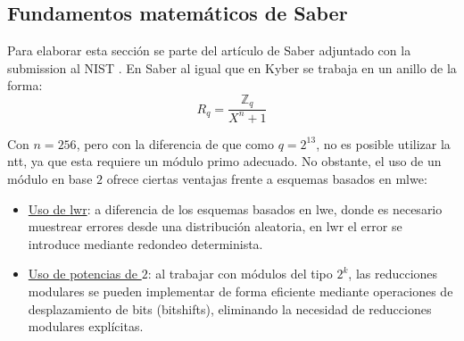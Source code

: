 \subsection{Fundamentos matemáticos de Saber}
Para elaborar esta sección se parte del artículo de Saber adjuntado con la submission al NIST \cite{saber-spec-2020}. En Saber al igual que en Kyber se trabaja en un anillo de la forma:
\begin{equation}
	R_q=\dfrac{\mathbb{Z}_q}{X^n+1}
\end{equation}

Con \(n=256\), pero con la diferencia de que como \(q=2^{13}\), no es posible utilizar la \gls{ntt}, ya que esta requiere un módulo primo adecuado. No obstante, el uso de un módulo en base \(2\) ofrece ciertas ventajas \cite{modlwr} frente a esquemas basados en \gls{mlwe}:
\begin{itemize}
	\item \underline{Uso de \gls{lwr}}: a diferencia de los esquemas basados en \gls{lwe}, donde es necesario muestrear errores desde una distribución aleatoria, en \gls{lwr} el error se introduce mediante redondeo determinista.
	\item \underline{Uso de potencias de \(2\)}: al trabajar con módulos del tipo \(2^k\), las reducciones modulares se pueden implementar de forma eficiente mediante operaciones de desplazamiento de bits (bitshifts), eliminando la necesidad de reducciones modulares explícitas.
\end{itemize}

